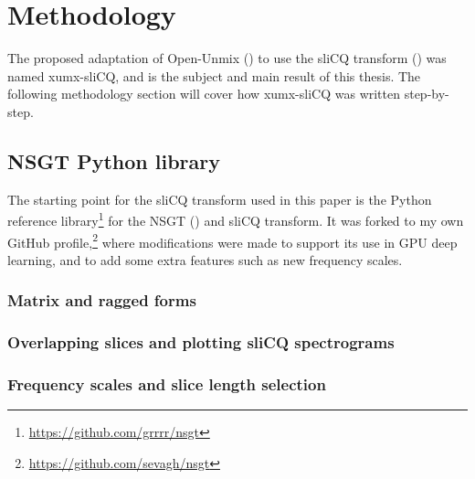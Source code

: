 \documentclass[report.tex]{subfiles}
\begin{document}
\section{Methodology}

The proposed adaptation of Open-Unmix (\cite{umx}) to use the sliCQ transform (\cite{slicq}) was named xumx-sliCQ, and is the subject and main result of this thesis. The following methodology section will cover how xumx-sliCQ was written step-by-step.

\subsection{NSGT Python library}

The starting point for the sliCQ transform used in this paper is the Python reference library\footnote{\url{https://github.com/grrrr/nsgt}} for the NSGT (\cite{slicq}) and sliCQ transform. It was forked to my own GitHub profile,\footnote{\url{https://github.com/sevagh/nsgt}} where modifications were made to support its use in GPU deep learning, and to add some extra features such as new frequency scales.

\subsubsection{Matrix and ragged forms}


\subsubsection{Overlapping slices and plotting sliCQ spectrograms}




\subsubsection{Frequency scales and slice length selection}
\end{document}

